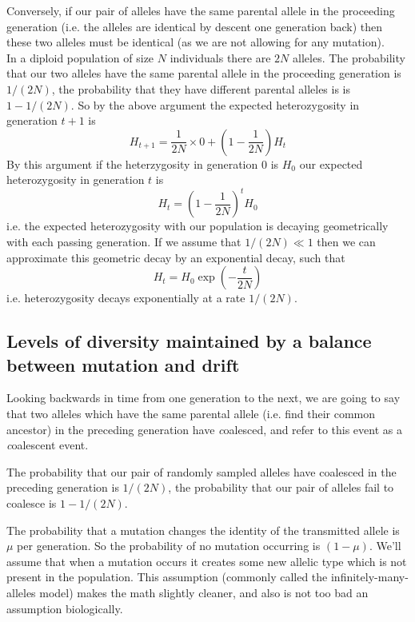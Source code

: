 Conversely, if our pair of alleles have the same parental allele in
the proceeding generation (i.e. the alleles are identical by descent
one generation back) then these two alleles must be identical (as we
are not allowing for any mutation). \\

In a diploid population of size $N$ individuals there are $2N$
alleles. The probability that our two alleles have the same parental
allele in the proceeding generation is $1/(2N)$, the probability that
they have different parental alleles is is $1-1/(2N)$. So by the above
argument the expected heterozygosity in generation $t+1$ is
\begin{equation}
H_{t+1} = \frac{1}{2N} \times 0 + \left(1-\frac{1}{2N} \right)H_t
\end{equation}
By this argument if the heterzygosity in generation $0$ is $H_0$ our
expected heterozygosity in generation $t$ is
\begin{equation}
H_t = \left(1-\frac{1}{2N} \right)^tH_0
\end{equation}
i.e. the expected heterozygosity with our population is decaying
geometrically with each passing generation. If we assume that $1/(2N)
\ll 1$ then we can approximate this geometric decay by an exponential
decay, such that
\begin{equation}
H_t =H_0 \exp \left(-\frac{t}{2N} \right)  
\end{equation}
i.e. heterozygosity decays exponentially at a rate $1/(2N)$.

\subsection{Levels of diversity maintained by a balance between
 mutation and drift} \label{DriftMutationBalance}

Looking backwards in time from one generation to the next, we are going
to say that two alleles which have the same parental allele (i.e. find
their common ancestor) in the
preceding generation have {\emph coalesced}, and refer to this event as a {\emph coalescent event}.

The probability that our pair of randomly sampled alleles have
coalesced in the preceding generation is $1/(2N)$, the probability
that our pair of alleles fail to coalesce is $1-1/(2N)$. 

The probability that a mutation changes the identity of the
transmitted allele is $\mu$ per generation. So the probability of no
mutation occurring is $(1-\mu)$. We'll assume that when a mutation
occurs it creates some new allelic type which is not present in the
population. This assumption (commonly called the infinitely-many-alleles model) makes the math slightly cleaner, and also
is not too bad an assumption biologically.


